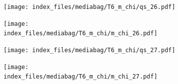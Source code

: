 \documentclass[
  11pt,
  letterpaper,
]{scrreprt}
\begin{document}
\begin{figure}

\begin{minipage}{0.50\linewidth}

\begin{figure}[H]

{\centering \texttt{[image: index\_files/mediabag/T6\_m\_chi/qs\_26.pdf]}

}


\end{figure}%

\end{minipage}%
%
\begin{minipage}{0.50\linewidth}

\begin{figure}[H]

{\centering \texttt{[image: index\_files/mediabag/T6\_m\_chi/m\_chi\_26.pdf]}

}


\end{figure}%

\end{minipage}%

\end{figure}%

\begin{figure}

\begin{minipage}{0.50\linewidth}

\begin{figure}[H]

{\centering \texttt{[image: index\_files/mediabag/T6\_m\_chi/qs\_27.pdf]}

}


\end{figure}%

\end{minipage}%
%
\begin{minipage}{0.50\linewidth}

\begin{figure}[H]

{\centering \texttt{[image: index\_files/mediabag/T6\_m\_chi/m\_chi\_27.pdf]}

}


\end{figure}%

\end{minipage}%

\end{figure}%
\end{document}
